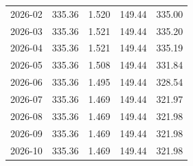 \begin{table}[H]
{\begin{tabular}{lrrrr}
2026-02 & 335.36 & 1.520 & 149.44 & 335.00 \\
2026-03 & 335.36 & 1.521 & 149.44 & 335.20 \\
2026-04 & 335.36 & 1.521 & 149.44 & 335.19 \\
2026-05 & 335.36 & 1.508 & 149.44 & 331.84 \\
2026-06 & 335.36 & 1.495 & 149.44 & 328.54 \\
2026-07 & 335.36 & 1.469 & 149.44 & 321.97 \\
2026-08 & 335.36 & 1.469 & 149.44 & 321.98 \\
2026-09 & 335.36 & 1.469 & 149.44 & 321.98 \\
2026-10 & 335.36 & 1.469 & 149.44 & 321.98 \\
\bottomrule
\end{tabular}}
\end{table}
